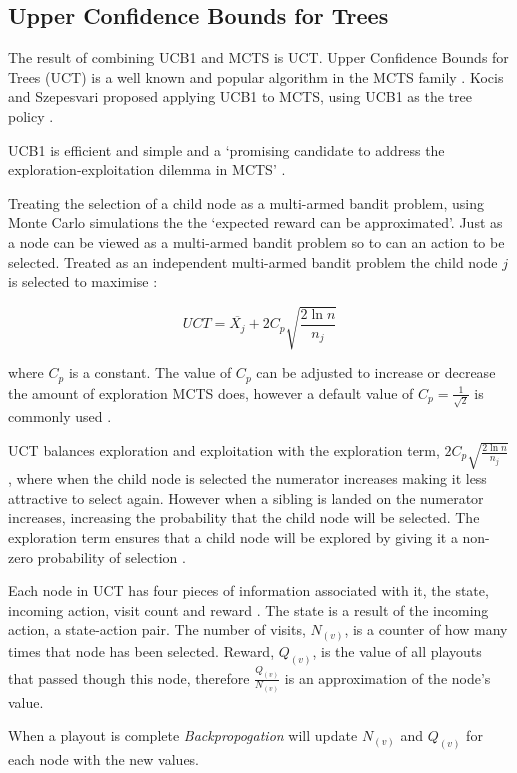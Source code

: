 \documentclass[conference]{IEEEtran}
\begin{document}
\subsection{Upper Confidence Bounds for Trees}
The result of combining UCB1 and MCTS is UCT. Upper Confidence Bounds for Trees (UCT) is a well known and popular algorithm in the MCTS family \cite{mctssurvey}. Kocis and Szepesvari \cite{kocsze} proposed applying UCB1 to MCTS, using UCB1 as the tree policy \cite{mctssurvey}.

UCB1 is efficient and simple \cite{mctssurvey} and a `promising candidate to address the exploration-exploitation dilemma in MCTS' \cite{mctssurvey}.

Treating the selection of a child node as a multi-armed bandit problem, using Monte Carlo simulations the the `expected reward can be approximated'. Just as a node can be viewed as a multi-armed bandit problem so to can an action to be selected. Treated as an independent multi-armed bandit problem the child node $j$ is selected to maximise \cite{mctssurvey}:

\[UCT = \overline{X_{j}} +2C_{p}\sqrt{\frac{2 \ln n}{n_{j}}}\]

where $C_{p}$ is a constant. The value of $C_{p}$ can be adjusted to increase or decrease the amount of exploration MCTS does, however a default value of $C_{p} = \frac{1}{\sqrt{2}}$ is commonly used \cite{mctssurvey}.

UCT balances exploration and exploitation with the exploration term, $2C_{p}\sqrt{\frac{2 \ln n}{n_{j}}}$, where when the child node is selected the numerator increases making it less attractive to select again. However when a sibling is landed on the numerator increases, increasing the probability that the child node will be selected. The exploration term ensures that a child node will be explored by giving it a non-zero probability of selection \cite{mctssurvey}.

Each node in UCT has four pieces of information associated with it, the state, incoming action, visit count and reward \cite{mctssurvey}. The state is a result of the incoming action, a state-action pair.  The number of visits, $N_{(v)}$, is a counter of how many times that node has been selected. Reward,  $Q_{(v)}$, is the value of all playouts that passed though this node, therefore $\frac{Q_{(v)}}{N_{(v)}}$ is an approximation of the node's value.

When a playout is complete {\em Backpropogation} will update $N_{(v)}$ and  $Q_{(v)}$ for each node with the new values.
\end{document}
